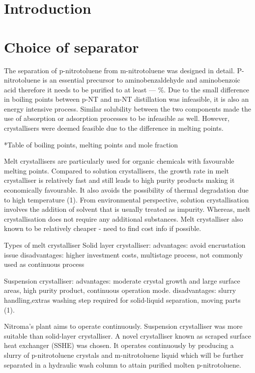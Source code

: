 \section{Introduction}


\section{Choice of separator}
The separation of p-nitrotoluene from m-nitrotoluene was designed in detail. P-nitrotoluene is an essential precursor to aminobenzaldehyde and aminobenzoic acid therefore it needs to be purified to at least --- \%. Due to the small difference in boiling points between p-NT and m-NT distillation was infeasible, it is also an energy intensive process. Similar solubility between the two components made the use of absorption or adsorption processes to be infeasible as well. However, crystallisers were deemed feasible due to the difference in melting points. 

*Table of boiling points, melting points and mole fraction 

Melt crystallisers are particularly used for organic chemicals with favourable melting points. Compared to solution crystallisers, the growth rate in melt crystalliser is relatively fast and still leads to high purity products making it economically favourable. It also avoids the possibility  of thermal degradation  due to high temperature (1). From environmental perspective, solution crystallisation involves the addition of solvent that is usually treated as impurity. Whereas, melt crystallisation does not require any additional substances. Melt crystalliser also known to be relatively cheaper - need to find cost info if possible.

Types of melt crystalliser
Solid layer crystalliser:
advantages: avoid encrustation issue
disadvantages: higher investment costs, multistage process, not commonly used as continuous process

Suspension crystalliser:
advantages: moderate crystal growth and large surface areas, high purity product, continuous operation mode.
disadvantages: slurry handling,extras washing step required for solid-liquid separation, moving parts (1). 

Nitroma’s plant aims to operate continuously. Suspension crystalliser was more suitable than solid-layer crystalliser. A novel crystalliser known as scraped surface heat exchanger (SSHE) was chosen. It operates continuously by producing a slurry of p-nitrotoluene crystals and m-nitrotoluene liquid which will be further separated in a hydraulic wash column to attain purified molten p-nitrotoluene. 

